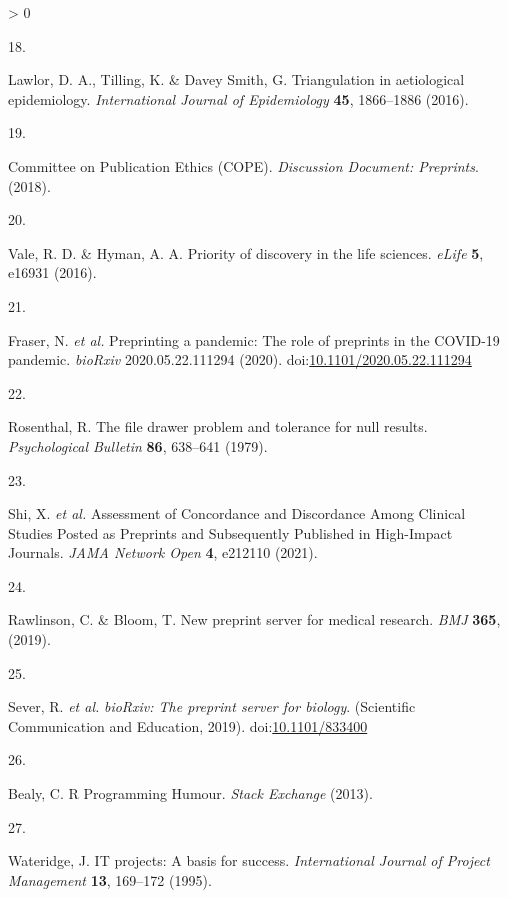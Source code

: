 \documentclass[a4paper, twoside]{templates/ociamthesis}
\newlength{\cslhangindent}
\newlength{\csllabelwidth}
\newenvironment{CSLReferences}[3] %
 {%
  \setlength{\parindent}{0pt}
  \ifodd #1 \everypar{\setlength{\hangindent}{\cslhangindent}}\ignorespaces\fi
  \ifnum #2 > 0
  \setlength{\parskip}{#2\baselineskip}
  \fi
 }%
 {}
\newcommand{\CSLLeftMargin}[1]{\parbox[t]{\maxof{\widthof{#1}}{\csllabelwidth}}{#1}}
\newcommand{\CSLRightInline}[1]{\parbox[t]{\linewidth - \csllabelwidth}{#1}}
\begin{document}
\begin{CSLReferences}{0}{0}
\leavevmode\hypertarget{ref-lawlor2016a}{}%
\CSLLeftMargin{18. }
\CSLRightInline{Lawlor, D. A., Tilling, K. \& Davey Smith, G. Triangulation in aetiological epidemiology. \emph{International Journal of Epidemiology} \textbf{45}, 1866--1886 (2016).}

\leavevmode\hypertarget{ref-committeeonpublicationethicscope2018}{}%
\CSLLeftMargin{19. }
\CSLRightInline{Committee on Publication Ethics (COPE). \emph{Discussion {Document}: {Preprints}}. (2018).}

\leavevmode\hypertarget{ref-vale2016}{}%
\CSLLeftMargin{20. }
\CSLRightInline{Vale, R. D. \& Hyman, A. A. Priority of discovery in the life sciences. \emph{eLife} \textbf{5}, e16931 (2016).}

\leavevmode\hypertarget{ref-fraser2020a}{}%
\CSLLeftMargin{21. }
\CSLRightInline{Fraser, N. \emph{et al.} Preprinting a pandemic: The role of preprints in the {COVID}-19 pandemic. \emph{bioRxiv} 2020.05.22.111294 (2020). doi:\href{https://doi.org/10.1101/2020.05.22.111294}{10.1101/2020.05.22.111294}}

\leavevmode\hypertarget{ref-rosenthal1979}{}%
\CSLLeftMargin{22. }
\CSLRightInline{Rosenthal, R. The file drawer problem and tolerance for null results. \emph{Psychological Bulletin} \textbf{86}, 638--641 (1979).}

\leavevmode\hypertarget{ref-shi2021a}{}%
\CSLLeftMargin{23. }
\CSLRightInline{Shi, X. \emph{et al.} Assessment of {Concordance} and {Discordance Among Clinical Studies Posted} as {Preprints} and {Subsequently Published} in {High}-{Impact Journals}. \emph{JAMA Network Open} \textbf{4}, e212110 (2021).}

\leavevmode\hypertarget{ref-rawlinson2019}{}%
\CSLLeftMargin{24. }
\CSLRightInline{Rawlinson, C. \& Bloom, T. New preprint server for medical research. \emph{BMJ} \textbf{365}, (2019).}

\leavevmode\hypertarget{ref-sever2019}{}%
\CSLLeftMargin{25. }
\CSLRightInline{Sever, R. \emph{et al.} \emph{{bioRxiv}: The preprint server for biology}. ({Scientific Communication and Education}, 2019). doi:\href{https://doi.org/10.1101/833400}{10.1101/833400}}

\leavevmode\hypertarget{ref-bealy2013}{}%
\CSLLeftMargin{26. }
\CSLRightInline{Bealy, C. R {Programming Humour}. \emph{Stack Exchange} (2013).}

\leavevmode\hypertarget{ref-wateridge1995}{}%
\CSLLeftMargin{27. }
\CSLRightInline{Wateridge, J. {IT} projects: A basis for success. \emph{International Journal of Project Management} \textbf{13}, 169--172 (1995).}


\end{CSLReferences}
\end{document}
